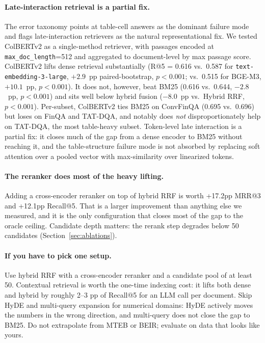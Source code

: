 \documentclass{article}
\begin{document}
\paragraph{Late-interaction retrieval is a partial fix.}
The error taxonomy points at table-cell answers as the dominant failure mode and flags late-interaction retrievers as the natural representational fix. We tested ColBERTv2 \citep{santhanam2022colbertv2} as a single-method retriever, with passages encoded at \texttt{max\_doc\_length}=512 and aggregated to document-level by max passage score. ColBERTv2 lifts dense retrieval substantially (R@5 = 0.616 vs.\ 0.587 for \texttt{text-embedding-3-large}, $+2.9$~pp paired-bootstrap, $p<0.001$; vs.\ 0.515 for BGE-M3, $+10.1$~pp, $p<0.001$). It does not, however, beat BM25 (0.616 vs.\ 0.644, $-2.8$~pp, $p<0.001$) and sits well below hybrid fusion ($-8.0$~pp vs.\ Hybrid RRF, $p<0.001$). Per-subset, ColBERTv2 ties BM25 on ConvFinQA (0.695 vs.\ 0.696) but loses on FinQA and TAT-DQA, and notably does \emph{not} disproportionately help on TAT-DQA, the most table-heavy subset. Token-level late interaction is a partial fix: it closes much of the gap from a dense encoder to BM25 without reaching it, and the table-structure failure mode is not absorbed by replacing soft attention over a pooled vector with max-similarity over linearized tokens.

\paragraph{The reranker does most of the heavy lifting.}
Adding a cross-encoder reranker on top of hybrid RRF is worth +17.2pp MRR@3 and +12.1pp Recall@5. That is a larger improvement than anything else we measured, and it is the only configuration that closes most of the gap to the oracle ceiling. Candidate depth matters: the rerank step degrades below 50 candidates (Section~\ref{sec:ablations}).

\paragraph{If you have to pick one setup.}
Use hybrid RRF with a cross-encoder reranker and a candidate pool of at least 50. Contextual retrieval is worth the one-time indexing cost: it lifts both dense and hybrid by roughly 2--3 pp of Recall@5 for an LLM call per document. Skip HyDE and multi-query expansion for numerical domains: HyDE actively moves the numbers in the wrong direction, and multi-query does not close the gap to BM25. Do not extrapolate from MTEB or BEIR; evaluate on data that looks like yours.
\end{document}
